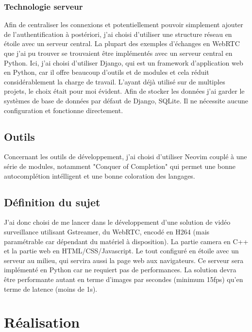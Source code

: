 \documentclass[12pt, a4paper]{report}
\begin{document}
\subsection{Technologie serveur}
Afin de centraliser les connexions et potentiellement pouvoir simplement ajouter de l'authentification à postériori, j'ai choisi d'utiliser une structure réseau en étoile avec un serveur central.\newline
La plupart des exemples d'échanges en WebRTC que j'ai pu trouver se trouvaient être implémentés avec un serveur central en Python.\newline
Ici, j'ai choisi d'utiliser Django, qui est un framework d'application web en Python, car il offre beaucoup d'outils et de modules et cela réduit considérablement la charge de travail. L'ayant déjà utilisé sur de multiples projets, le choix était pour moi évident.\newline
Afin de stocker les données j'ai garder le systèmes de base de données par défaut de Django, SQLite. Il ne nécessite aucune configuration et fonctionne directement.

\section{Outils}
Concernant les outils de développement, j'ai choisi d'utiliser Neovim couplé à une série de modules, notamment "Conquer of Completion" qui permet une bonne autocomplétion intélligent et une bonne coloration des langages.

\section{Définition du sujet}
J'ai donc choisi de me lancer dans le développement d'une solution de vidéo surveillance utilisant Gstreamer, du WebRTC, encodé en H264 (mais paramétrable car dépendant du matériel à disposition). La partie camera en C++ et la partie web en HTML/CSS/Javascript.\newline
Le tout configuré en étoile avec un serveur au milieu, qui servira aussi la page web aux navigateurs. Ce serveur sera implémenté en Python car ne requiert pas de performances.\newline
La solution devra être performante autant en terme d'images par secondes (minimum 15fps) qu'en terme de latence (moins de 1s).\newline

\chapter{Réalisation}
\end{document}
